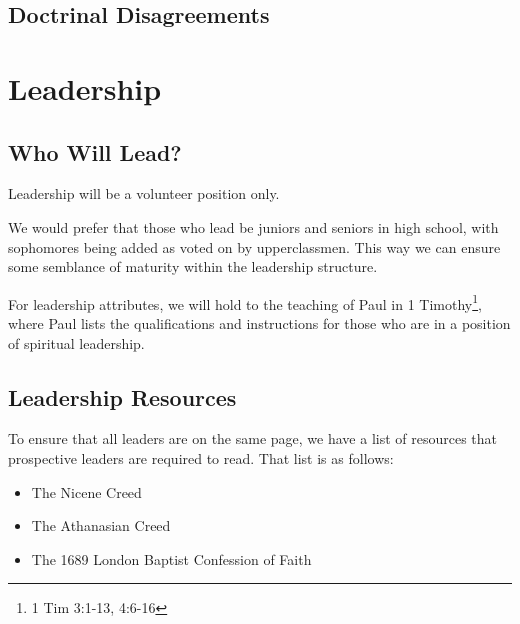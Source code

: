\documentclass[12pt]{article}
\begin{document}
\subsection{Doctrinal Disagreements}



\section{Leadership}

\subsection{Who Will Lead?}

  Leadership will be a volunteer position only.

  We would prefer that those who lead be juniors and seniors in high school,
with sophomores being added as voted on by upperclassmen. This way we can ensure
some semblance of maturity within the leadership structure.

  For leadership attributes, we will hold to the teaching of Paul in
1 Timothy\footnote{1 Tim 3:1-13, 4:6-16}, where Paul lists the
qualifications and instructions for those who are in a position of spiritual
leadership.

\subsection{Leadership Resources}

To ensure that all leaders are on the same page, we have a list of resources
that prospective leaders are required to read. That list is as follows:


\begin{itemize}

	\item The Nicene Creed

	\item The Athanasian Creed

	\item The 1689 London Baptist Confession of Faith


\end{itemize}
\end{document}
